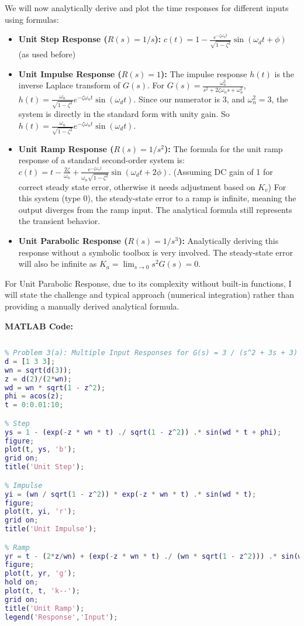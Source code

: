 \documentclass{article}
\begin{document}
	We will now analytically derive and plot the time responses for different inputs using formulas:
	
	\begin{itemize}
		\item \textbf{Unit Step Response ($R(s) = 1/s$):}
		$c(t) = 1 - \frac{e^{-\zeta\omega_n t}}{\sqrt{1-\zeta^2}} \sin(\omega_d t + \phi)$ (as used before)
		
		\item \textbf{Unit Impulse Response ($R(s) = 1$):}
		The impulse response $h(t)$ is the inverse Laplace transform of $G(s)$.
		For $G(s) = \frac{\omega_n^2}{s^2+2\zeta\omega_n s+\omega_n^2}$,
		$h(t) = \frac{\omega_n}{\sqrt{1-\zeta^2}} e^{-\zeta\omega_n t} \sin(\omega_d t)$.
		Since our numerator is 3, and $\omega_n^2=3$, the system is directly in the standard form with unity gain.
		So $h(t) = \frac{\omega_n}{\sqrt{1-\zeta^2}} e^{-\zeta\omega_n t} \sin(\omega_d t)$.
		
		\item \textbf{Unit Ramp Response ($R(s) = 1/s^2$):}
		The formula for the unit ramp response of a standard second-order system is:
		$c(t) = t - \frac{2\zeta}{\omega_n} + \frac{e^{-\zeta\omega_n t}}{\omega_n\sqrt{1-\zeta^2}} \sin(\omega_d t + 2\phi)$.
		(Assuming DC gain of 1 for correct steady state error, otherwise it needs adjustment based on $K_v$)
		For this system (type 0), the steady-state error to a ramp is infinite, meaning the output diverges from the ramp input. The analytical formula still represents the transient behavior.
		
		\item \textbf{Unit Parabolic Response ($R(s) = 1/s^3$):}
		Analytically deriving this response without a symbolic toolbox is very involved. The steady-state error will also be infinite as $K_a = \lim_{s \to 0} s^2 G(s) = 0$.
	\end{itemize}
	For Unit Parabolic Response, due to its complexity without built-in functions, I will state the challenge and typical approach (numerical integration) rather than providing a manually derived analytical formula.
	
	\textbf{MATLAB Code:}
	\begin{lstlisting}[language=Matlab, caption=MATLAB Code for Problem 3(a) (Using Formulas)]
	
% Problem 3(a): Multiple Input Responses for G(s) = 3 / (s^2 + 3s + 3)
d = [1 3 3];
wn = sqrt(d(3));
z = d(2)/(2*wn);
wd = wn * sqrt(1 - z^2);
phi = acos(z);
t = 0:0.01:10;

% Step
ys = 1 - (exp(-z * wn * t) ./ sqrt(1 - z^2)) .* sin(wd * t + phi);
figure;
plot(t, ys, 'b');
grid on;
title('Unit Step');

% Impulse
yi = (wn / sqrt(1 - z^2)) * exp(-z * wn * t) .* sin(wd * t);
figure; 
plot(t, yi, 'r'); 
grid on; 
title('Unit Impulse');

% Ramp
yr = t - (2*z/wn) + (exp(-z * wn * t) ./ (wn * sqrt(1 - z^2))) .* sin(wd * t + 2*phi);
figure;
plot(t, yr, 'g');
hold on; 
plot(t, t, 'k--'); 
grid on;
title('Unit Ramp'); 
legend('Response','Input');

	
	\end{lstlisting}
	
\end{document}
